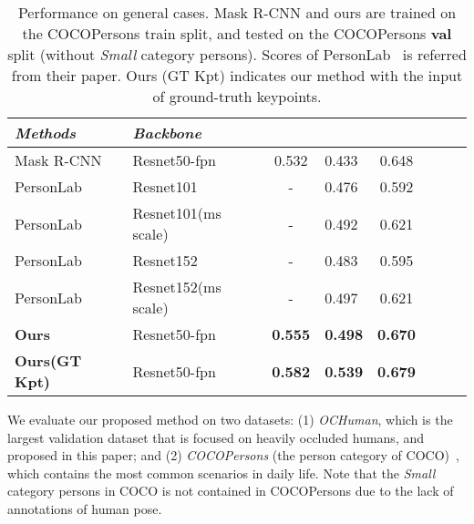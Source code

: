 \documentclass[10pt,twocolumn,letterpaper]{article}
\begin{document}
\setlength{\tabcolsep}{4pt}
\begin{table}
\small
\begin{center}
\begin{tabular}{llclclcl}
\toprule[1.5pt]
\emph{Methods} & \emph{Backbone} &  &  &  \\
\hline\noalign{\smallskip}
Mask R-CNN & Resnet50-fpn & 0.532 & 0.433 & 0.648\\
PersonLab & Resnet101 & - & 0.476 & 0.592\\
PersonLab & Resnet101(ms scale) & - & 0.492 & 0.621\\
PersonLab & Resnet152 & - & 0.483 & 0.595\\
PersonLab & Resnet152(ms scale) & -  & 0.497 & 0.621\\
\midrule[1pt]
\textbf{Ours} & Resnet50-fpn  & \textbf{0.555} & \bf{0.498} & \bf{0.670}\\
\textbf{Ours(GT Kpt)} & Resnet50-fpn  & \textbf{0.582}  & \bf{0.539} & \bf{0.679}\\
\bottomrule[1.5pt]
\end{tabular}
\end{center}
\setlength{\abovecaptionskip}{-0.1cm}
\setlength{\belowcaptionskip}{-0.5cm}
\caption{Performance on general cases. Mask R-CNN and ours are trained on the COCOPersons train split, and tested on the COCOPersons \textbf{val} split (without \emph{Small} category persons). Scores of PersonLab~\cite{papandreou2018personlab} is referred from their paper. Ours (GT Kpt) indicates our method with the input of ground-truth keypoints.}
\label{table:score_general}
\end{table}
\setlength{\tabcolsep}{1.4pt}

We evaluate our proposed method on two datasets: (1) \emph{OCHuman}, which is the largest validation dataset that is focused on heavily occluded humans, and proposed in this paper; and (2) \emph{COCOPersons} (the person category of COCO)~\cite{lin2014microsoft}, which contains the most common scenarios in daily life. Note that the \emph{Small} category persons in COCO is not contained in COCOPersons due to the lack of annotations of human pose. 
\end{document}
